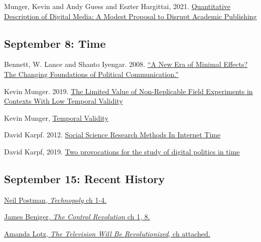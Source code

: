 \vspace{-.1in}\documentclass[11pt]{article}
\begin{document}
\noindent Munger, Kevin and Andy Guess and Eszter Hargittai, 2021. \href{https://journalqd.org/article/view/2713/1825}{Quantitative Description of Digital Media: A Modest Proposal to Disrupt Academic Publishing}


\subsection*{September 8: Time}


\noindent Bennett, W. Lance and Shanto Iyengar. 2008. \href{https://github.com/kmunger/MSMP21/blob/main/bennett.pdf}{``A New Era of Minimal Effects? The Changing Foundations of Political Communication.'' }


\noindent Kevin Munger. 2019. \href{https://journals.sagepub.com/doi/full/10.1177/2056305119859294}{The Limited Value of Non-Replicable Field Experiments in Contexts With Low Temporal Validity}


\noindent Kevin Munger, \href{https://osf.io/ca5wz/}{Temporal Validity}

\noindent David Karpf. 2012. \href{https://github.com/kmunger/MSMP21/blob/main/karpf2012.pdf}{Social Science Research Methods In Internet Time }

\noindent David Karpf, 2019. \href{https://github.com/kmunger/MSMP21/blob/main/karpf2020.pdf}{Two provocations for the study of digital politics in time}



\subsection*{September 15: Recent History}


\href{https://github.com/kmunger/MSMP21/blob/main/tech.pdf}{Neil Postman, \textit{Technopoly} ch 1-4.}

\noindent \href{https://github.com/kmunger/MSMP21/blob/main/control.pdf}{James Beniger, \textit{The Control Revolution} ch 1, 8.}

\noindent \href{https://github.com/kmunger/MSMP21/blob/main/lotz.pdf}{Amanda Lotz, \textit{The Television Will Be Revolutionized}, ch attached.}




\end{document}
